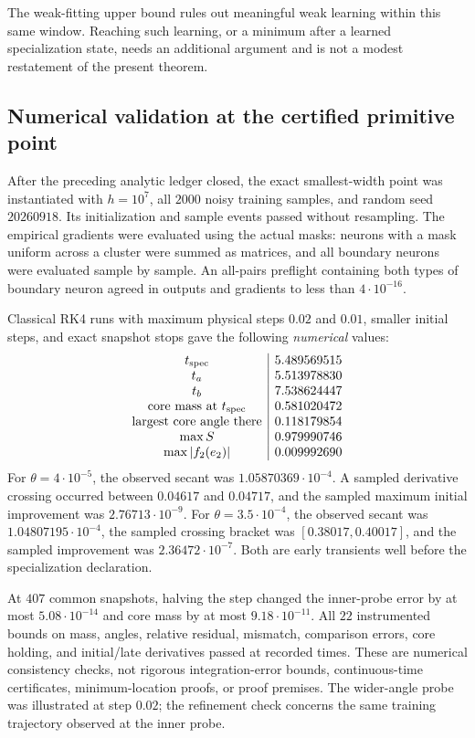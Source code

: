 \documentclass{article} %
\theoremstyle{plain}
\theoremstyle{definition}
\theoremstyle{remark}
\begin{document}
The weak-fitting upper bound rules out meaningful weak learning within
this same window. Reaching such learning, or a minimum after a learned
specialization state, needs an additional argument and is not a modest
restatement of the present theorem.

\subsection{Numerical validation at the certified primitive point}

After the preceding analytic ledger closed, the exact smallest-width
point was instantiated with $h=10^7$, all $2000$ noisy training samples,
and random seed $20260918$. Its initialization and sample events passed
without resampling. The empirical gradients were evaluated using the
actual masks: neurons with a mask uniform across a cluster were summed
as matrices, and all boundary neurons were evaluated sample by sample.
An all-pairs preflight containing both types of boundary neuron agreed
in outputs and gradients to less than $4\cdot10^{-16}$.

Classical RK4 runs with maximum physical steps $0.02$ and $0.01$,
smaller initial steps, and exact snapshot stops gave the following
\emph{numerical} values:
\[
\begin{array}{c|r}
 t_{\rm spec}&5.489569515\\
 t_a&5.513978830\\
 t_b&7.538624447\\
 \text{core mass at }t_{\rm spec}&0.581020472\\
 \text{largest core angle there}&0.118179854\\
 \max S&0.979990746\\
 \max |f_2(e_2)|&0.009992690
\end{array}
\]
For $\theta=4\cdot10^{-5}$, the observed secant was
$1.05870369\cdot10^{-4}$. A sampled derivative crossing occurred between
$0.04617$ and $0.04717$, and the sampled maximum initial improvement was
$2.76713\cdot10^{-9}$.
For $\theta=3.5\cdot10^{-4}$, the observed secant was
$1.04807195\cdot10^{-4}$, the sampled crossing bracket was
$[0.38017,0.40017]$, and the sampled improvement was
$2.36472\cdot10^{-7}$. Both are early transients well before the
specialization declaration.

At $407$ common snapshots, halving the step changed the inner-probe
error by at most $5.08\cdot10^{-14}$ and core mass by at most
$9.18\cdot10^{-11}$. All $22$ instrumented bounds on mass, angles,
relative residual, mismatch, comparison errors, core holding, and
initial/late derivatives passed at recorded times. These are numerical
consistency checks, not rigorous integration-error bounds, continuous-time
certificates, minimum-location proofs, or proof premises. The wider-angle
probe was illustrated at step $0.02$; the refinement check concerns the
same training trajectory observed at the inner probe.
\end{document}
